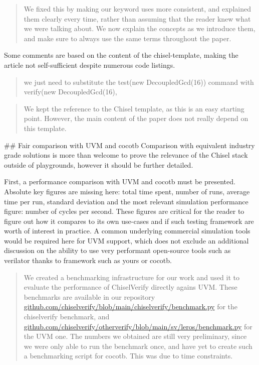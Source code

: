 \documentclass{article}
\newcommand{\martin}[1]{{\color{blue} Martin: #1\\}}
\newcommand{\reply}[1]{{\color{blue} #1}}
\begin{document}
\begin{quote}
\reply{
We fixed this by making our keyword uses more consistent, and explained them clearly every time, rather than assuming that the reader knew what we were talking about.
We now explain the concepts as we introduce them, and make sure to always use the same terms throughout the paper.
}
\end{quote}


Some comments are based on the content of the chisel-template, making the article not self-sufficient despite numerous code listings.
\begin{quote}
we just need to substitute the test(new DecoupledGcd(16)) command with verify(new DecoupledGcd(16),
\end{quote}

\begin{quote}
\reply{
We kept the reference to the Chisel template, as this is an easy starting point.
However, the main content of the paper does not really depend on this template.
}
\end{quote}


\#\# Fair comparison with UVM and cocotb
Comparison with equivalent industry grade solutions is more than welcome to prove the relevance of the Chisel stack outside of playgrounds, however it should be further detailed.

First, a performance comparison with UVM and cocotb must be presented.
Absolute key figures are missing here: total time spent, number of runs, average time per run, standard deviation and the most relevant simulation performance figure: number of cycles per second.
These figures are critical for the reader to figure out how it compares to its own use-cases and if such testing framework are worth of interest in practice.
A common underlying commercial simulation tools would be required here for UVM support, which does not exclude an additional discussion on the ability to use very performant open-source tools such as verilator thanks to framework such as yours or cocotb.


\begin{quote}
\reply{
We created a benchmarking infrastructure for our work and used it to evaluate the performance of ChiselVerify directly agains UVM. 
These benchmarks are available in our repository \url{github.com/chiselverify/blob/main/chiselverify/benchmark.py} for the chiselverify benchmark, and  \url{github.com/chiselverify/otherverify/blob/main/sv/leros/benchmark.py} for the UVM one.
The numbers we obtained are still very preliminary, since we were only able to run the benchmark once, and have yet to create such a benchmarking script for cocotb. This was due to time constraints.
}
\end{quote}
\end{document}
